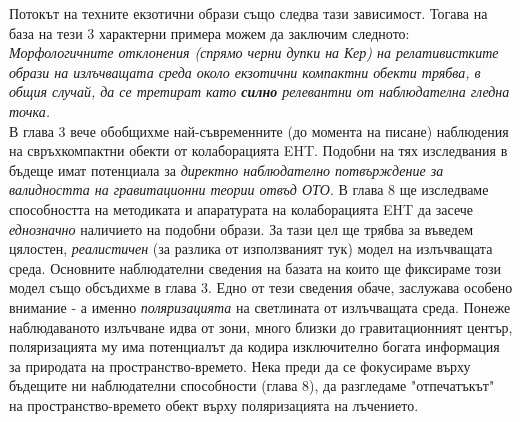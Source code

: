 Потокът на техните екзотични образи също следва тази зависимост. Тогава на база на тези 3 характерни примера можем да заключим следното:\\

\emph{Морфологичните отклонения (спрямо черни дупки на Кер) на релативистките образи на излъчващата среда около екзотични компактни обекти трябва, в общия случай, да се третират като \textbf{силно} релевантни от наблюдателна гледна точка.}\\

В глава 3 вече обобщихме най-съвременните (до момента на писане) наблюдения на свръхкомпактни обекти от колаборацията EHT. Подобни на тях изследвания в бъдеще имат потенциала за \emph{директно наблюдателно потвърждение за валидността на гравитационни теории отвъд ОТО}. В глава 8 ще изследваме способността на методиката и апаратурата на колаборацията EHT да засече \emph{еднозначно} наличието на подобни образи. За тази цел ще трябва за въведем цялостен, \emph{реалистичен} (за разлика от използваният тук) модел на излъчващата среда. Основните наблюдателни сведения на базата на които ще фиксираме този модел също обсъдихме в глава 3. Едно от тези сведения обаче, заслужава особено внимание - а именно \emph{поляризацията} на светлината от излъчващата среда. Понеже наблюдаваното излъчване идва от зони, много близки до гравитационният център, поляризацията му има потенциалът да кодира изключително богата информация за природата на пространство-времето. Нека преди да се фокусираме върху бъдещите ни наблюдателни способности (глава 8), да разгледаме "отпечатъкът"$\,$ на пространство-времето обект върху поляризацията на лъчението. 

